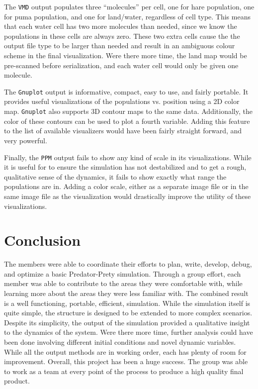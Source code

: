 \documentclass[a4paper,11pt]{article}
\begin{document}
The \texttt{VMD} output populates three ``molecules'' per cell, one for hare population, one for puma population, and one for land/water, regardless of cell type.  This means that each water cell has two more molecules than needed, since we know the populations in these cells are always zero.  These two extra cells cause the the output file type to be larger than needed and result in an ambiguous colour scheme in the final visualization.  Were there more time, the land map would be pre-scanned before serialization, and each water cell would only be given one molecule.

The \texttt{Gnuplot} output is informative, compact, easy to use, and fairly portable.  It provides useful visualizations of the populations vs. position using a 2D color map.   \texttt{Gnuplot} also supports 3D contour maps to the same data.  Additionally, the color of these contours can be used to plot a fourth variable.  Adding this feature to the list of available visualizers would have been fairly straight forward, and very powerful.  

Finally, the \texttt{PPM} output fails to show any kind of scale in its visualizations.  While it is useful for to ensure the simulation has not destabilized and to get a rough, qualitative sense of the dynamics, it fails to show exactly what range the populations are in.  Adding a color scale, either as a separate image file or in the same image file as the visualization would drastically improve the utility of these visualizations.
 
 \section{Conclusion}

The members were able to coordinate their efforts to plan, write, develop, debug, and optimize a basic Predator-Prety simulation.  Through a group effort, each member was able to contribute to the areas they were comfortable with, while learning more about the areas they were less familiar with.   The combined result is a well functioning, portable, efficient,   simulation.  While the simulation itself is quite simple, the structure is designed to be extended to more complex scenarios.  Despite its simplicity, the output of the simulation provided a qualitative insight to the dynamics of the system.  Were there more time, further analysis could have been done involving different initial conditions and novel dynamic variables.  While all the output methods are in working order, each has plenty of room for improvement.  Overall, this project has been a huge success.  The group was able to work as a team at every point of the process to produce a high quality final product. 
\end{document}
